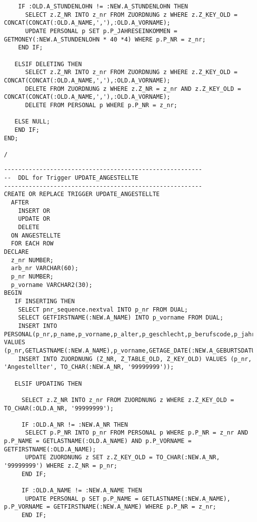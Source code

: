 \documentclass{scrartcl}
\begin{document}
\begin{lstlisting}
    IF :OLD.A_STUNDENLOHN != :NEW.A_STUNDENLOHN THEN
      SELECT z.Z_NR INTO z_nr FROM ZUORDNUNG z WHERE z.Z_KEY_OLD = CONCAT(CONCAT(:OLD.A_NAME,','),:OLD.A_VORNAME);
      UPDATE PERSONAL p SET p.P_JAHRESEINKOMMEN = GETMONEY(:NEW.A_STUNDENLOHN * 40 *4) WHERE p.P_NR = z_nr;
    END IF;
    
   ELSIF DELETING THEN
      SELECT z.Z_NR INTO z_nr FROM ZUORDNUNG z WHERE z.Z_KEY_OLD = CONCAT(CONCAT(:OLD.A_NAME,','),:OLD.A_VORNAME);
      DELETE FROM ZUORDNUNG z WHERE z.Z_NR = z_nr AND z.Z_KEY_OLD = CONCAT(CONCAT(:OLD.A_NAME,','),:OLD.A_VORNAME);
      DELETE FROM PERSONAL p WHERE p.P_NR = z_nr;
    
   ELSE NULL;
   END IF;
END;

/
\end{lstlisting}

\begin{lstlisting}
--------------------------------------------------------
--  DDL for Trigger UPDATE_ANGESTELLTE
--------------------------------------------------------
CREATE OR REPLACE TRIGGER UPDATE_ANGESTELLTE
  AFTER 
    INSERT OR 
    UPDATE OR 
    DELETE 
  ON ANGESTELLTE
  FOR EACH ROW
DECLARE
  z_nr NUMBER;
  arb_nr VARCHAR(60);
  p_nr NUMBER;
  p_vorname VARCHAR2(30);
BEGIN
   IF INSERTING THEN
    SELECT pnr_sequence.nextval INTO p_nr FROM DUAL;
    SELECT GETFIRSTNAME(:NEW.A_NAME) INTO p_vorname FROM DUAL;
    INSERT INTO PERSONAL(p_nr,p_name,p_vorname,p_alter,p_geschlecht,p_berufscode,p_jahreseinkommen) VALUES (p_nr,GETLASTNAME(:NEW.A_NAME),p_vorname,GETAGE_DATE(:NEW.A_GEBURTSDATUM),GETGENDERCODE(:NEW.A_GESCHLECHT,p_vorname),GETJOBCODE(:NEW.A_BERUFSBEZEICHNUNG),GETMONEY(:NEW.A_MONATSGEHALT));
    INSERT INTO ZUORDNUNG (Z_NR, Z_TABLE_OLD, Z_KEY_OLD) VALUES (p_nr, 'Angestellter', TO_CHAR(:NEW.A_NR, '99999999'));
    
   ELSIF UPDATING THEN

     SELECT z.Z_NR INTO z_nr FROM ZUORDNUNG z WHERE z.Z_KEY_OLD = TO_CHAR(:OLD.A_NR, '99999999');

     IF :OLD.A_NR != :NEW.A_NR THEN
      SELECT p.P_NR INTO p_nr FROM PERSONAL p WHERE p.P_NR = z_nr AND p.P_NAME = GETLASTNAME(:OLD.A_NAME) AND p.P_VORNAME = GETFIRSTNAME(:OLD.A_NAME); 
      UPDATE ZUORDNUNG z SET z.Z_KEY_OLD = TO_CHAR(:NEW.A_NR, '99999999') WHERE z.Z_NR = p_nr;
     END IF;

     IF :OLD.A_NAME != :NEW.A_NAME THEN
      UPDATE PERSONAL p SET p.P_NAME = GETLASTNAME(:NEW.A_NAME), p.P_VORNAME = GETFIRSTNAME(:NEW.A_NAME) WHERE p.P_NR = z_nr;
     END IF;
     

\end{lstlisting}
\end{document}
